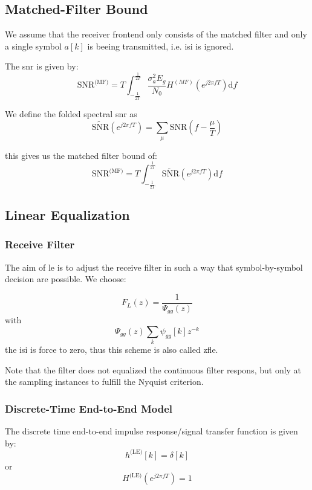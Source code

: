 \subsection{Matched-Filter Bound}
We assume that the receiver frontend only consists of the matched filter and only
a single symbol $a[k]$ is beeing transmitted, i.e. \ac{isi} is ignored.

The \ac{snr} is given by:
\begin{equation}
    \text{SNR}^\text{(MF)} = T \int_{-\frac{1}{2T}}^\frac{1}{2T}
        \frac{\sigma_a^2 E_g}{N_0} H^{(MF)} \left(e^{j2 \pi f T}\right)
        \text{d}f
\end{equation}

We define the folded spectral \ac{snr} as
\begin{equation}
    \tilde{\text{SNR}}\left(e^{j 2 \pi f T}\right) =
    \sum_\mu \text{SNR}\left(f - \frac{\mu}{T}\right)
\end{equation}

this gives us the matched filter bound of:
\begin{equation}
    \text{SNR}^\text{(MF)} = T \int_{-\frac{1}{2T}}^\frac{1}{2T} 
        \tilde{\text{SNR}} \left(e^{j 2 \pi f T}\right) \text{d}f
\end{equation}

\subsection{Linear Equalization}
\subsubsection{Receive Filter}
The aim of \ac{le} is to adjust the receive filter in such a way that symbol-by-symbol
decision are possible. We choose:

\begin{equation}
    F_L(z) = \frac{1}{\Psi_{gg}(z)}
\end{equation}
with
\begin{equation}
    \Psi_{gg}(z) \sum_k \psi_{gg}[k] z^{-k}
\end{equation}
the \ac{isi} is force to zero, thus this scheme is also called \ac{zfle}.

Note that the filter does not equalized the continuous filter respons, but
only at the sampling instances to fulfill the Nyquist criterion. 

\subsubsection{Discrete-Time End-to-End Model}
The discrete time end-to-end impulse response/signal transfer function is given by:
\begin{equation}
    h^\text{(LE)}[k] = \delta[k]
\end{equation}
or
\begin{equation}
    H^\text{(LE)}\left(e^{j 2 \pi f T}\right) = 1
\end{equation}

